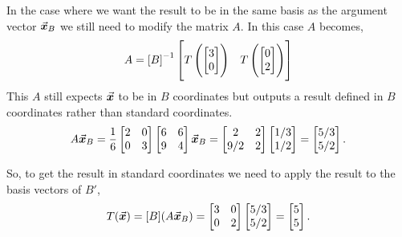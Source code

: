 \documentclass[MathsNotesBase.tex]{subfiles}
\begin{document}
{\begin{exe}
{				In the case where we want the result to be in the same basis as the argument vector $\vec{\bm{x}}_B$ we still need to modify the matrix $A$. In this case $A$ becomes,
				\[ A = {[B]}^{-1}\begin{bmatrix}
						T\left(\begin{bmatrix}3 \\ 0\end{bmatrix}\right) & T\left(\begin{bmatrix}0 \\ 2\end{bmatrix}\right)
						\end{bmatrix}
				\]
				This $A$ still expects $\vec{\bm{x}}$ to be in $B$ coordinates but outputs a result defined in $B$ coordinates rather than standard coordinates.
				\[ A\vec{\bm{x}}_B = \frac{1}{6}\begin{bmatrix}
							2 & 0\\
							0 & 3
							\end{bmatrix}
							\begin{bmatrix}
							6 & 6\\
							9 & 4
							\end{bmatrix}
							\vec{\bm{x}}_B =
							\begin{bmatrix}
							2 & 2\\
							9/2 & 2
							\end{bmatrix}
							\begin{bmatrix}
							1/3\\
							1/2
							\end{bmatrix} =
							\begin{bmatrix}
							5/3\\
							5/2
							\end{bmatrix}.
				\]
				
				So, to get the result in standard coordinates we need to apply the result to the basis vectors of $B'$,
				\[ T(\vec{\bm{x}}) = [B](A\vec{\bm{x}}_B) =
							\begin{bmatrix}
							3 & 0\\
							0 & 2
							\end{bmatrix}
				 			\begin{bmatrix}
				 			5/3\\
				 			5/2
				 			\end{bmatrix} =
				 			\begin{bmatrix}
				 			5\\
				 			5
				 			\end{bmatrix}.
				\]
			}
		\end{exe}
	
}
\end{document}
